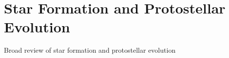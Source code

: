 \section{Star Formation and Protostellar Evolution}
Broad review of star formation and protostellar evolution